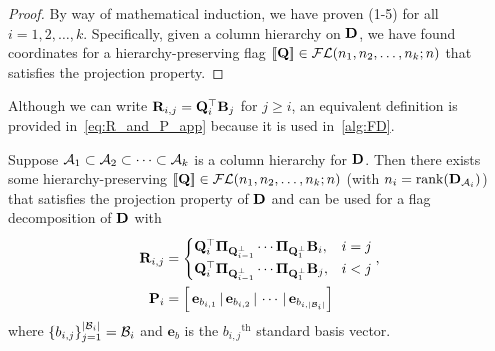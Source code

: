 \begin{proof}
    
    By way of mathematical induction, we have proven (1-5) for all $i=1,2,\dots,k$. Specifically, given a column hierarchy on $\mathbf{D}$, we have found coordinates for a hierarchy-preserving flag $[\![\mathbf{Q}]\!] \in \mathcal{FL}(n_1,n_2,\dots,n_k;n)$ that satisfies the projection property.
\end{proof}

Although we can write $\mathbf{R}_{i,j} = \mathbf{Q}_i^\top\mathbf{B}_j$ for $j \geq i$, an equivalent definition is provided in~\cref{eq:R_and_P_app} because it is used in~\cref{alg:FD}.

\begin{prop}\label{prop:proj_prop_and_flags_app}
 Suppose $\mathcal{A}_1 \subset \mathcal{A}_2 \subset \cdots \subset \mathcal{A}_k$ is a column hierarchy for $\mathbf{D}$. Then there exists some hierarchy-preserving 
 $[\![\mathbf{Q}]\!] \in \mathcal{FL}(n_1,n_2,\dots, n_k;n)$ (with $n_i = \mathrm{rank}(\mathbf{D}_{\mathcal{A}_i})$) 
 that satisfies the projection property of $\mathbf{D}$ and can be used for a flag decomposition of $\mathbf{D}$ with
    \begin{align}\label{eq:R_and_P_app}
    \mathbf{R}_{i,j} &= 
        \begin{cases}
            \mathbf{Q}_i^\top\boldsymbol{\Pi}_{\mathbf{Q}_{i-1}^\perp}\cdots \boldsymbol{\Pi}_{\mathbf{Q}_1^\perp} \mathbf{B}_i, &i=j\\
            \mathbf{Q}_i^\top\boldsymbol{\Pi}_{\mathbf{Q}_{i-1}^\perp}\cdots \boldsymbol{\Pi}_{\mathbf{Q}_1^\perp} \mathbf{B}_j, &i < j
        \end{cases},\\
        \mathbf{P}_i &= \left[ \,\mathbf{e}_{b_{i,1}}\,|\, \mathbf{e}_{b_{i,2}}\,|\, \cdots\,|\, \mathbf{e}_{b_{i,|\mathcal{B}_i|}} \right]
    \end{align}
    where $\{b_{i,j}\}_{j=1}^{|\mathcal{B}_i|} = \mathcal{B}_i$ and $\mathbf{e}_{b}$ is the $b_{i,j}$$^{\mathrm{th}}$ standard basis vector.
\end{prop}
